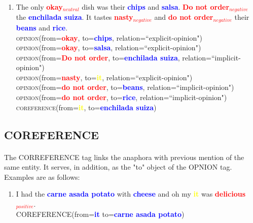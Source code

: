 \documentclass{article}
\begin{document}
\begin{enumerate}[resume]
\item The only \textbf{\textcolor{red}{okay$_{neutral}$}} dish was their \textbf{\textcolor{blue}{chips}} and \textbf{\textcolor{blue}{salsa}}. \textbf{\textcolor{red}{Do not order$_{negative}$}} the \textbf{\textcolor{blue}{enchilada suiza}}. It tastes \textbf{\textcolor{red}{nasty$_{negative}$}} and \textbf{\textcolor{red}{do not order$_{negative}$}} their \textbf{\textcolor{blue}{beans}} and \textbf{\textcolor{blue}{rice}}. \\
\textsc{opinion}(from=\textbf{\textcolor{red}{okay}}, to=\textbf{\textcolor{blue}{chips}}, relation=``explicit-opinion")\\
\textsc{opinion}(from=\textbf{\textcolor{red}{okay}}, to=\textbf{\textcolor{blue}{salsa}}, relation=``explicit-opinion")\\
\textsc{opinion}(from=\textbf{\textcolor{red}{Do not order}}, to=\textbf{\textcolor{blue}{enchilada suiza}}, relation=``implicit-opinion")\\
\textsc{opinion}(from=\textbf{\textcolor{red}{nasty}}, to=\textbf{\textcolor{yellow}{it}}, relation=``explicit-opinion")\\
\textsc{opinion}(from=\textbf{\textcolor{red}{do not order}}, to=\textbf{\textcolor{blue}{beans}}, relation=``implicit-opinion")\\
\textsc{opinion}(from=\textbf{\textcolor{red}{do not order}}, to=\textbf{\textcolor{blue}{rice}}, relation=``implicit-opinion")\\
\textsc{coreference}(from=\textbf{\textcolor{yellow}{it}}, to=\textbf{\textcolor{blue}{enchilada suiza}})
\end{enumerate}



\subsection{COREFERENCE}
\paragraph{}
The CORREFERENCE tag links the anaphora with previous mention of the same entity. It serves, in addition, as the "to" object of the OPNION tag. Examples are as follows:

\begin{enumerate}[resume]
	\item I had the \textbf{\textcolor{blue}{carne asada potato}} with \textbf{\textcolor{blue}{cheese}} and oh my \textbf{\textcolor{yellow}{it}} was \textbf{\textcolor{red}{delicious$_{positive}$}}.\\
	\textsc{COREFERENCE}(from=\textbf{\textcolor{blue}{it}} to=\textbf{\textcolor{blue}{carne asada potato}}) \\
\end{enumerate}
\end{document}
